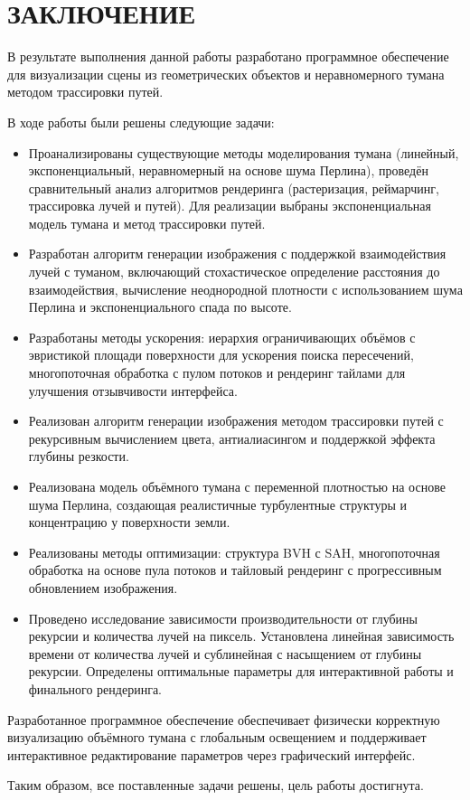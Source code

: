 \section*{ЗАКЛЮЧЕНИЕ}

В результате выполнения данной работы разработано программное обеспечение для визуализации сцены из геометрических объектов и неравномерного тумана методом трассировки путей.

В ходе работы были решены следующие задачи:

\begin{itemize}
    \item Проанализированы существующие методы моделирования тумана (линейный, экспоненциальный, неравномерный на основе шума Перлина), проведён сравнительный анализ алгоритмов рендеринга (растеризация, реймарчинг, трассировка лучей и путей). Для реализации выбраны экспоненциальная модель тумана и метод трассировки путей.
    
    \item Разработан алгоритм генерации изображения с поддержкой взаимодействия лучей с туманом, включающий стохастическое определение расстояния до взаимодействия, вычисление неоднородной плотности с использованием шума Перлина и экспоненциального спада по высоте.
    
    \item Разработаны методы ускорения: иерархия ограничивающих объёмов с эвристикой площади поверхности для ускорения поиска пересечений, многопоточная обработка с пулом потоков и рендеринг тайлами для улучшения отзывчивости интерфейса.
    
    \item Реализован алгоритм генерации изображения методом трассировки путей с рекурсивным вычислением цвета, антиалиасингом и поддержкой эффекта глубины резкости.
    
    \item Реализована модель объёмного тумана с переменной плотностью на основе шума Перлина, создающая реалистичные турбулентные структуры и концентрацию у поверхности земли.
    
    \item Реализованы методы оптимизации: структура BVH с SAH, многопоточная обработка на основе пула потоков и тайловый рендеринг с прогрессивным обновлением изображения.
    
    \item Проведено исследование зависимости производительности от глубины рекурсии и количества лучей на пиксель. Установлена линейная зависимость времени от количества лучей и сублинейная с насыщением от глубины рекурсии. Определены оптимальные параметры для интерактивной работы и финального рендеринга.
\end{itemize}

Разработанное программное обеспечение обеспечивает физически корректную визуализацию объёмного тумана с глобальным освещением и поддерживает интерактивное редактирование параметров через графический интерфейс.

Таким образом, все поставленные задачи решены, цель работы достигнута.

\clearpage
